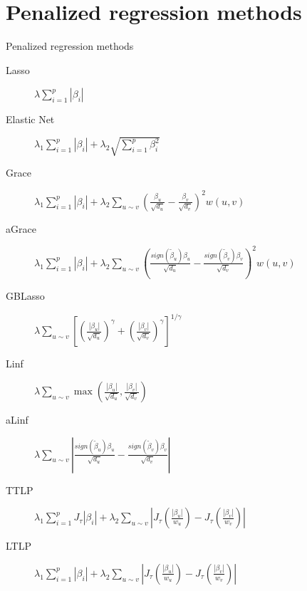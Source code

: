 \documentclass{beamer}
\begin{document}
\section{Penalized regression methods}
\begin{frame}{Penalized regression methods}
\small
\begin{description}
	\item[Lasso] $\lambda\sum_{i=1}^{p}\left|\beta_i\right|$
	\item[Elastic Net] $\lambda_1\sum_{i=1}^{p}\left|\beta_i\right| + \lambda_2\sqrt{\sum_{i=1}^{p}\beta_i^2}$
	\item[Grace] $\lambda_1\sum_{i=1}^{p}\left|\beta_i\right| + \lambda_2\sum_{u \sim v}\left(\frac{\beta_u}{\sqrt{d_u}}-\frac{\beta_v}{\sqrt{d_v}}\right)^2w(u,v)$
	\item[aGrace] $\lambda_1\sum_{i=1}^{p}\left|\beta_i\right| + \lambda_2\sum_{u \sim v}\left(\frac{sign(\tilde{\beta}_u)\beta_u}{\sqrt{d_u}}-\frac{sign(\tilde{\beta}_v)\beta_v}{\sqrt{d_v}}\right)^2w(u,v)$
	\item[GBLasso] $\lambda\sum_{u \sim v}
	\left[\left(\frac{|\beta_u|}{\sqrt{d_u}}\right)^\gamma+
	\left(\frac{|\beta_v|}{\sqrt{d_v}}\right)^\gamma\right]^{1/\gamma}$
	\item[Linf] $\lambda\sum_{u \sim v}\max\left(\frac{|\beta_u|}{\sqrt{d_u}},\frac{|\beta_v|}{\sqrt{d_v}}\right)$
	\item[aLinf] $\lambda\sum_{u \sim v}\left|\frac{sign(\tilde{\beta}_u)\beta_u}{\sqrt{d_u}}-\frac{sign(\tilde{\beta}_v)\beta_v}{\sqrt{d_v}}\right|$
	\item[TTLP] $\lambda_1 \sum_{i=1}^{p} J_\tau|\beta_i| + \lambda_2 \sum_{u \sim v} \left|J_\tau\left(\frac{|\beta_u|}{w_u}\right)-J_\tau\left(\frac{|\beta_v|}{w_v}\right)\right|$
	\item[LTLP] $\lambda_1 \sum_{i=1}^{p}\left|\beta_i\right| + \lambda_2 \sum_{u \sim v} \left|J_\tau\left(\frac{|\beta_u|}{w_u}\right)-J_\tau\left(\frac{|\beta_v|}{w_v}\right)\right|$
\end{description}
\normalsize
\end{frame}
\end{document}
